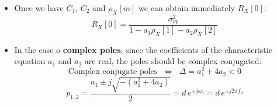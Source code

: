 \begin{itemize}
\[
\begin{cases}
C_{1}=-\frac{1}{p_{2}-p_{1}}\!\left(\frac{a_{1}}{1-a_{2}}-p_{2}\right)
     =-\frac{1}{\sqrt{a_{1}^{2}+4a_{2}}}
       \left(\frac{a_{1}}{1-a_{2}}-\frac{a_{1}+\sqrt{a_{1}^{2}+4a_{2}}}{2}\right)\\
C_{2}= \frac{1}{p_{2}-p_{1}}\!\left(\frac{a_{1}}{1-a_{2}}-p_{1}\right)
     = \frac{1}{\sqrt{a_{1}^{2}+4a_{2}}}
       \left(\frac{a_{1}}{1-a_{2}}-\frac{a_{1}-\sqrt{a_{1}^{2}+4a_{2}}}{2}\right).
\end{cases}\]\vspace{0.5em}
\[
\hspace{-4.5em}p_{1} = \frac{a_{1}-\sqrt{a_{1}^{2}+4a_{2}}}{2},\quad 
p_{2} = \frac{a_{1}+\sqrt{a_{1}^{2}+4a_{2}}}{2},\quad\Rightarrow\quad
p_{2}-p_{1} = \frac{a_{1}+\sqrt{a_{1}^{2}+4a_{2}}}{2}
             -\frac{a_{1}-\sqrt{a_{1}^{2}+4a_{2}}}{2}
           = \sqrt{a_{1}^{2}+4a_{2}}.
\]
\item Once we have \(C_1\), \(C_2\) and \(\rho_X[m]\) we can obtain immediately \(R_X[0]\):
\[
R_X[0]=\frac{\sigma_W^2}{1-a_1\rho_X[1]-a_2\rho_X[2]}
\]
\item In the case o \textbf{complex poles}, since the coefficients of the characteristic equation \(a_1\) and \(a_2\) are real, the poles should be complex conjugated:
\[
\text{Complex conjugate poles} 
\;\;\Longleftrightarrow\;\;
\Delta = a_{1}^{2}+4a_{2} < 0
\]
\vspace{-0.5em}
\[
p_{1,2}
  = \frac{a_{1} \pm j\sqrt{-\left(a_{1}^{2}+4a_{2}\right)}}{2}
  = d\,e^{\pm j\omega_{0}}
  = d\,e^{\pm j2\pi f_{0}}
\]


\end{itemize}
